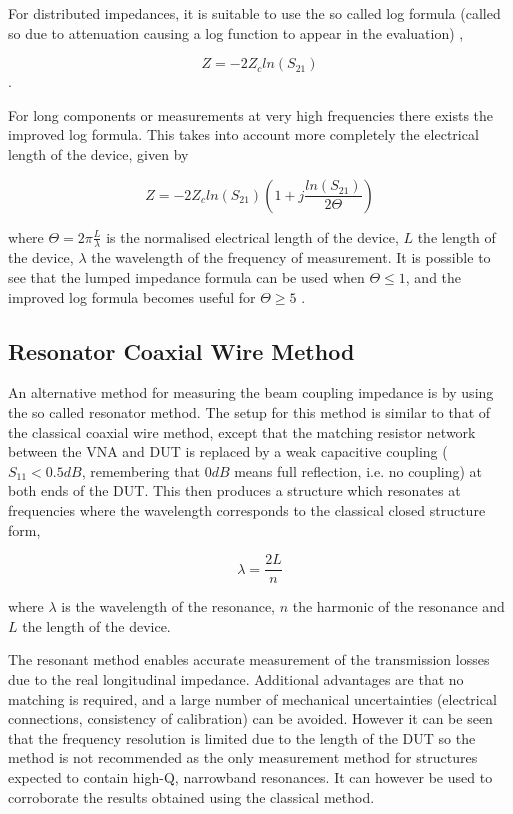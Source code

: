 \documentclass[review, number, sort&compress]{elsarticle}
\begin{document}
For distributed impedances, it is suitable to use the so called log formula (called so due to attenuation causing a log function to appear in the evaluation) \cite{Hahn:BenchMeasInter, Hahn: ValidityImpMeas, Jensen:ImprovLogForm},

\begin{equation}
Z = -2Z_{c} ln \left( S_{21} \right)
\end{equation}.

For long components or measurements at very high frequencies there exists the improved log formula. This takes into account more completely the electrical length of the device, given by

\begin{equation}
Z = -2Z_{c} ln \left( S_{21}  \right) \left( 1 + j\frac{ln \left( S_{21}\right) }{2\Theta}  \right)
\end{equation}

where $\Theta = 2\pi \frac{L}{\lambda}$ is the normalised electrical length of the device, $L$ the length of the device, $\lambda$ the wavelength of the frequency of measurement. It is possible to see that the lumped impedance formula can be used when $\Theta \leq 1$, and the improved log formula becomes useful for $\Theta \geq 5$ \cite{Jensen:ImprovLogForm}.




\subsection{Resonator Coaxial Wire Method}
\label{sec:reson-coax-meth}

An alternative method for measuring the beam coupling impedance is by using the so called resonator method. The setup for this method is similar to that of the classical coaxial wire method, except that the matching resistor network between the VNA and DUT is replaced by a weak capacitive coupling ($S_{11} < 0.5dB$, remembering that $0dB$ means full reflection, i.e. no coupling) at both ends of the DUT. This then produces a structure which resonates at frequencies where the wavelength corresponds to the classical closed structure form,

\begin{equation}
\lambda = \frac{2L}{n}
\end{equation}

where $\lambda$ is the wavelength of the resonance, $n$ the harmonic of the resonance and $L$ the length of the device. 

The resonant method enables accurate measurement of the transmission losses due to the real longitudinal impedance. Additional advantages are that no matching is required, and a large number of mechanical uncertainties (electrical connections, consistency of calibration) can be avoided. However it can be seen that the frequency resolution is limited due to the length of the DUT so the method is not recommended as the only measurement method for structures expected to contain high-Q, narrowband resonances. It can however be used to corroborate the results obtained using the classical method.
\end{document}
